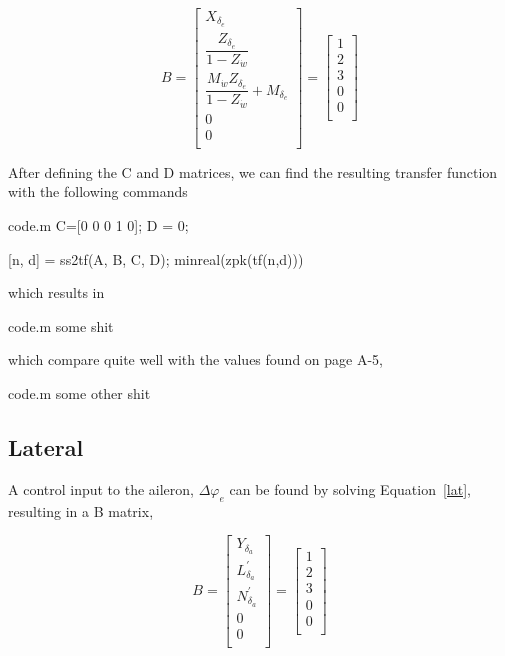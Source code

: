 \documentclass[12pt]{article}
\begin{document}
\begin{equation*}
B =
\begin{bmatrix}
   X_{\delta_e} \\
   \dfrac{Z_{\delta_e}}{1-Z_{\dot{w}}} \\
   \dfrac{M_{\dot{w}} Z_{\delta_e}}{1-Z_{\dot{w}}} + M_{\delta_e} \\
   0 \\
   0 \\
\end{bmatrix}
=
\begin{bmatrix}
   1 \\
   2 \\
   3 \\
   0 \\
   0 \\
\end{bmatrix}
\end{equation*}

\noindent After defining the C and D matrices, we can find the resulting transfer function with the following commands
\begin{filecontents*}{code.m}
C=[0 0 0 1 0];
D = 0;

[n, d] = ss2tf(A, B, C, D);
minreal(zpk(tf(n,d)))
\end{filecontents*}


\noindent which results in
\begin{filecontents*}{code.m}
some shit
\end{filecontents*}


\noindent which compare quite well with the values found on page A-5,

\begin{filecontents*}{code.m}
some other shit
\end{filecontents*}


\subsection{Lateral}
\noindent A control input to the aileron, $\Delta \varphi_e$ can be found by solving Equation~\ref{lat}, resulting in a B matrix,

\begin{equation*}
B =
\begin{bmatrix}
   Y_{\delta_a} \\
   L_{\delta_a}^\prime \\
   N_{\delta_a}^\prime \\
   0 \\
   0 \\
\end{bmatrix}
=
\begin{bmatrix}
   1 \\
   2 \\
   3 \\
   0 \\
   0 \\
\end{bmatrix}
\end{equation*}
\end{document}
